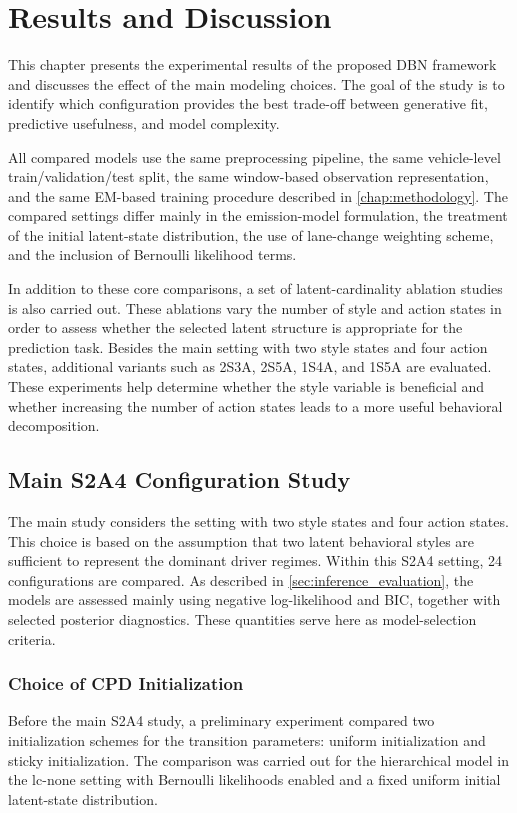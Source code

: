 \chapter{Results and Discussion}
\label{chap:exp}
This chapter presents the experimental results of the proposed \ac{DBN} framework and discusses the effect of the main modeling choices. 
The goal of the study is to identify which configuration provides the best trade-off between generative fit, predictive usefulness, and model complexity.

\par All compared models use the same preprocessing pipeline, the same vehicle-level train/validation/test split, the same window-based observation representation, 
and the same \ac{EM}-based training procedure described in \autoref{chap:methodology}. 
The compared settings differ mainly in the emission-model formulation, the treatment of the initial latent-state distribution, the use of lane-change weighting scheme, 
and the inclusion of Bernoulli likelihood terms.

\par In addition to these core comparisons, a set of latent-cardinality ablation studies is also carried out. 
These ablations vary the number of style and action states in order to assess whether the selected latent structure is appropriate for the prediction task. 
Besides the main setting with two style states and four action states, additional variants such as 2S3A, 2S5A, 1S4A, and 1S5A are evaluated. 
These experiments help determine whether the style variable is beneficial and whether increasing the number of action states leads to a more useful behavioral decomposition.


\section{Main S2A4 Configuration Study}
\label{sec:main_s2a4_study}
The main study considers the setting with two style states and four action states. 
This choice is based on the assumption that two latent behavioral styles are sufficient to represent the dominant driver regimes.
Within this S2A4 setting, 24 configurations are compared.
As described in \autoref{sec:inference_evaluation}, the models are assessed mainly using negative log-likelihood and \ac{BIC}, 
together with selected posterior diagnostics. 
These quantities serve here as model-selection criteria.

\subsection{Choice of CPD Initialization}
Before the main S2A4 study, a preliminary experiment compared two initialization schemes for the transition parameters: 
uniform initialization and sticky initialization. 
The comparison was carried out for the hierarchical model in the lc-none setting with Bernoulli likelihoods enabled and a fixed uniform initial latent-state distribution. 

